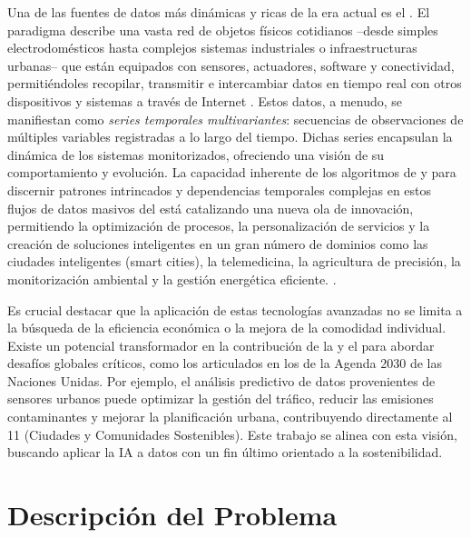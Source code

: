 Una de las fuentes de datos más dinámicas y ricas de la era actual es el . El paradigma  describe una vasta red de objetos físicos cotidianos –desde simples electrodomésticos hasta complejos sistemas industriales o infraestructuras urbanas– que están equipados con sensores, actuadores, software y conectividad, permitiéndoles recopilar, transmitir e intercambiar datos en tiempo real con otros dispositivos y sistemas a través de Internet \citep{Gubbi2013}. Estos datos, a menudo, se manifiestan como \textit{series temporales multivariantes}: secuencias de observaciones de múltiples variables registradas a lo largo del tiempo. Dichas series encapsulan la dinámica de los sistemas monitorizados, ofreciendo una visión de su comportamiento y evolución. La capacidad inherente de los algoritmos de  y  para discernir patrones intrincados y dependencias temporales complejas en estos flujos de datos masivos del  está catalizando una nueva ola de innovación, permitiendo la optimización de procesos, la personalización de servicios y la creación de soluciones inteligentes en un gran número de dominios como las ciudades inteligentes (smart cities), la telemedicina, la agricultura de precisión, la monitorización ambiental y la gestión energética eficiente. \citep{ahmed_big_2017}.

Es crucial destacar que la aplicación de estas tecnologías avanzadas no se limita a la búsqueda de la eficiencia económica o la mejora de la comodidad individual. Existe un potencial transformador en la contribución de la  y el  para abordar desafíos globales críticos, como los articulados en los   de la Agenda 2030 de las Naciones Unidas. Por ejemplo, el análisis predictivo de datos  provenientes de sensores urbanos puede optimizar la gestión del tráfico, reducir las emisiones contaminantes y mejorar la planificación urbana, contribuyendo directamente al  11 (Ciudades y Comunidades Sostenibles). Este trabajo se alinea con esta visión, buscando aplicar la IA a datos  con un fin último orientado a la sostenibilidad.

\section{Descripción del Problema}
\label{subsec:descripcion_problema_intro}


